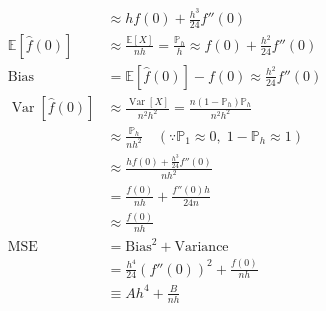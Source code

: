 \documentclass[11pt]{article}
\newcommand{\opn}{\operatorname}
\begin{document}
\begin{itemize}
\begin{align*}
    &\approx hf\left(0\right) +\frac{h^{3}}{24}f''\left(0\right)\\
    \mathbb{E}\left[\hat{f}\left(0\right)\right] &\approx \frac{\mathbb{E}\left[X\right]}{nh} = \frac{\mathbb{P}_{h}}{h}\approx f\left(0\right) + \frac{h^{2}}{24}f''\left(0\right)\\
    \text{Bias} &= \mathbb{E}\left[\hat{f}\left(0\right)\right] - f\left(0\right) \approx \frac{h^{2}}{24}f''\left(0\right)\\
    \opn{Var}\left[\hat{f}\left(0\right)\right] &\approx \frac{\opn{Var}\left[X\right]}{n^{2}h^{2}} = \frac{n\left(1-\mathbb{P}_{h}\right)\mathbb{P}_{h}}{n^{2}h^{2}}\\
    &\approx \frac{\mathbb{P}_{h}}{nh^{2}} \quad (\because \mathbb{P}_{1}\approx 0, \; 1-\mathbb{P}_{h} \approx 1)\\
    &\approx \frac{hf\left(0\right) + \frac{h^{3}}{24}f''\left(0\right)}{nh^{2}}\\
    &= \frac{f\left(0\right)}{nh} + \frac{f''\left(0\right)h}{24n}\\
    &\approx \frac{f\left(0\right)}{nh}\\
    \text{MSE} &= \text{Bias}^{2} + \text{Variance}\\
    &= \frac{h^{4}}{24}\left(f''\left(0\right)\right)^{2} + \frac{f\left(0\right)}{nh}\\
    &\equiv Ah^{4} + \frac{B}{nh}
  \end{align*}
\end{itemize}
\end{document}
